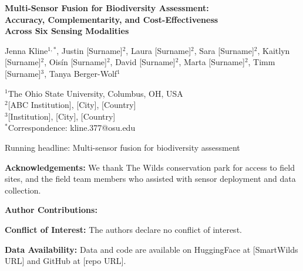 \documentclass[12pt]{article}
\begin{document}
\pagestyle{plain}


\begin{titlepage}
\centering
\vspace*{2cm}

{\LARGE \bfseries Multi-Sensor Fusion for Biodiversity Assessment:\\
Accuracy, Complementarity, and Cost-Effectiveness\\
Across Six Sensing Modalities\par}

\vspace{2cm}

{\large
Jenna Kline$^{1,*}$,
Justin [Surname]$^{2}$,
Laura [Surname]$^{2}$,
Sara [Surname]$^{2}$,
Kaitlyn [Surname]$^{2}$,
Ois\'{i}n [Surname]$^{2}$,
David [Surname]$^{2}$,
Marta [Surname]$^{2}$,
Timm [Surname]$^{3}$,
Tanya Berger-Wolf$^{1}$
\par}

\vspace{1cm}

$^{1}$The Ohio State University, Columbus, OH, USA\\
$^{2}$[ABC Institution], [City], [Country]\\
$^{3}$[Institution], [City], [Country]\\

\vspace{1cm}
$^{*}$Correspondence: kline.377@osu.edu

\vspace{2cm}

Running headline: Multi-sensor fusion for biodiversity assessment

\vspace{2cm}

\textbf{Acknowledgements:} We thank The Wilds conservation park for access to field sites, and the field team members who assisted with sensor deployment and data collection. %

\textbf{Author Contributions:} %

\textbf{Conflict of Interest:} The authors declare no conflict of interest.

\textbf{Data Availability:} Data and code are available on HuggingFace at [SmartWilds URL] and GitHub at [repo URL]. %

\end{titlepage}
\end{document}
